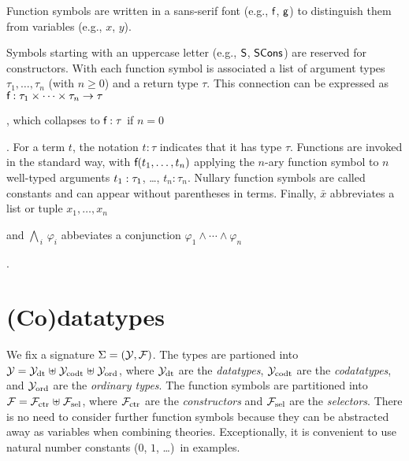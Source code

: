 \begin{report}
Function symbols are written in a sans-serif font (e.g., $\textsf{f}$, $\textsf{g}$) to
distinguish them from variables (e.g., $x$, $y$).
\end{report}
Symbols starting with an uppercase letter (e.g.,
$\textsf{S}$, $\textsf{SCons}$) are reserved for constructors. With each function symbol 
is associated a list of argument types $\tau_1,\ldots,\tau_n$ (with $n \ge 0$)
and a return type $\tau$. This connection can be expressed %
as $\textsf{f} : \tau_1 \times \cdots \times \tau_n \to \tau$\begin{report},
which collapses to $\textsf{f} : \tau$ if $n = 0$\end{report}.
For a term $t$, the notation $t : \tau$ indicates that it has type $\tau$.
Functions are invoked in the standard way, with $\textsf{f}(t_1,\ldots,t_n)$
applying the $n$-ary function symbol
 to $n$ well-typed arguments $t_1 :\nobreak \tau_1$, \ldots, $t_n :
\tau_n$. Nullary function symbols are called constants and can appear without
parentheses in terms.
%
Finally, $\bar x$ abbreviates a list or tuple $x_1,\ldots,x_n$\begin{report}
and $\bigwedge_{\,i}\, \varphi_i$ abbeviates a conjunction
$\varphi_1 \mathrel\land \cdots \mathrel\land \varphi_n$\end{report}.


\section{%
(Co)datatypes}
\label{sec:the-theory-of-co-datatypes}


We fix a signature $\mathrm{\Sigma} = (\mathcal{Y}, \mathcal{F})$. The types are partioned into
$\mathcal{Y} = \mathcal{Y}_{\mathrm{dt}} \mathrel{\uplus} \mathcal{Y}_{\mathrm{codt}} \mathrel{\uplus} \mathcal{Y}_{\mathrm{ord}}$, where $\mathcal{Y}_{\mathrm{dt}}$ are the
\emph{datatypes}, $\mathcal{Y}_{\mathrm{codt}}$ are the \emph{codatatypes}, and $\mathcal{Y}_{\mathrm{ord}}$ are the %
\emph{ordinary types}. The function symbols are partitioned into $\mathcal{F} = \mathcal{F}_{\mathrm{ctr}}
\mathrel{\uplus} \mathcal{F}_{\mathrm{sel}}$, where $\mathcal{F}_{\mathrm{ctr}}$ are the \emph{constructors} and $\mathcal{F}_{\mathrm{sel}}$ are the
\emph{selectors}. There is no need to consider further function symbols
because they can be abstracted away as variables when combining theories.
Exceptionally, it is convenient to use natural number
constants ($0$, $1$, \ldots)\ in examples.

